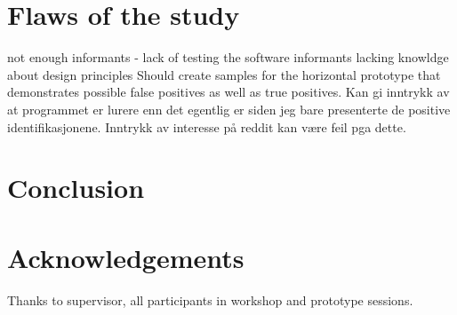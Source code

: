 \documentclass{report}
\begin{document}
\section{Flaws of the study}
\label{flaws-of-study}
not enough informants - lack of testing the software
informants lacking knowldge about design principles
Should create samples for the horizontal prototype that demonstrates possible false positives as well as true positives. Kan gi inntrykk av at programmet er lurere enn det egentlig er siden jeg bare presenterte de positive identifikasjonene. Inntrykk av interesse på reddit kan være feil pga dette.

\section{Conclusion}
\label{conclusion}

\section{Acknowledgements}
\label{acknowledgements}
Thanks to supervisor, all participants in workshop and prototype sessions.

\printbibliography

\appendix
\label{appendix}

\end{document}
